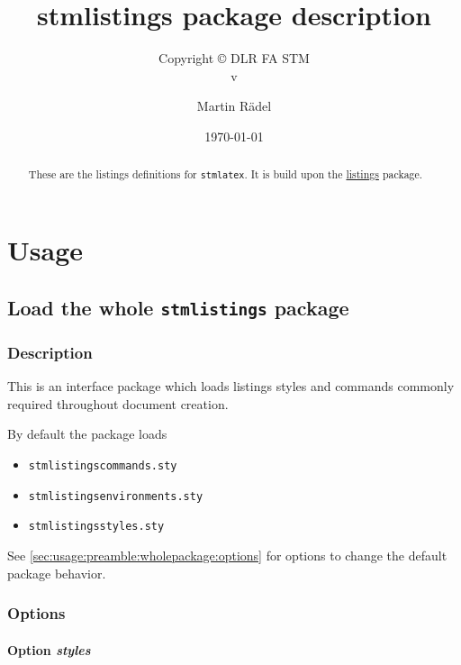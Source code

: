 \documentclass[%
  type=article,%
  layout=koma,%
  hyperref=true,%
  date=true,%
  listings=false,%
  tabular=true,%
]{stmtext}
\author{Martin R\"{a}del}
\title{stmlistings package description}
\subtitle{Copyright \copyright{} \the\year{} DLR FA STM\\v\formatdate[versiondatestyle]{\DTMToday}}
\date{\today}
\begin{document}
\maketitle

\begin{abstract}
These are the listings definitions for \texttt{stmlatex}. It is build upon the \href{https://ctan.org/pkg/listings}{listings} package.
\end{abstract}

\tableofcontents

\section{Usage}%

\subsection{Load the whole \protect\texttt{stmlistings} package}
\label{sec:usage:preamble:wholepackage}

\subsubsection{Description}
\label{sec:usage:preamble:wholepackage:description}

This is an interface package which loads listings styles and commands commonly required throughout document creation.

By default the package loads

\begin{itemize}[noitemsep]
  \item \verb+stmlistingscommands.sty+
  \item \verb+stmlistingsenvironments.sty+
  \item \verb+stmlistingsstyles.sty+
\end{itemize}

See \autoref{sec:usage:preamble:wholepackage:options} for options to change the default package behavior.

\subsubsection{Options}
\label{sec:usage:preamble:wholepackage:options}

\paragraph{Option \protect\textit{styles}} 
\label{sec:usage:preamble:wholepackage:options:styles}
\end{document}
